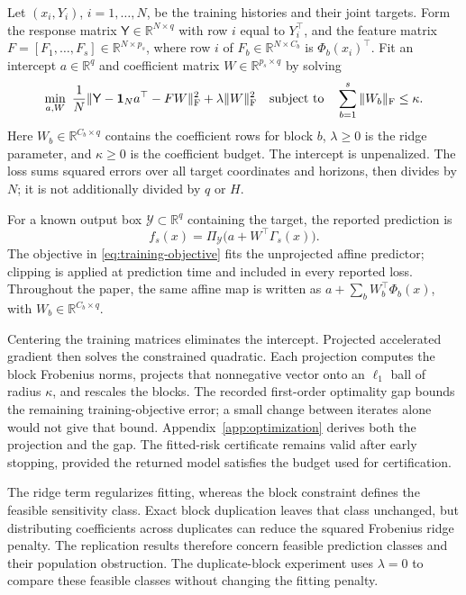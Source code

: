 Let $(x_i,Y_i)$, $i=1,\ldots,N$, be the training histories and their joint
targets. Form the response matrix $\mathsf Y\in\mathbb R^{N\times q}$
with row $i$ equal to $Y_i^\top$, and the feature matrix
$F=[F_1,\ldots,F_s]\in\mathbb R^{N\times p_s}$, where
row $i$ of $F_b\in\mathbb R^{N\times C_b}$ is
$\Phi_b(x_i)^\top$. Fit an intercept $a\in\mathbb R^q$ and coefficient
matrix $W\in\mathbb R^{p_s\times q}$ by solving
\begin{equation}
 \min_{a,W}\ \frac1N\|\mathsf Y-\mathbf1_Na^\top-FW\|_{\rm F}^2
                   +\lambda\|W\|_{\rm F}^2
 \quad\text{subject to}\quad
                \sum_{b=1}^s\|W_b\|_{\rm F}\leq\kappa.
 \label{eq:training-objective}
\end{equation}
Here $W_b\in\mathbb R^{C_b\times q}$ contains the coefficient rows for
block $b$, $\lambda\geq0$ is the ridge parameter, and $\kappa\geq0$ is
the coefficient budget. The intercept is unpenalized. The loss sums squared
errors over all target coordinates and horizons, then divides by $N$; it is
not additionally divided by $q$ or $H$.

For a known output box $\mathcal Y\subset\mathbb R^q$ containing the
target, the reported prediction is
\[
 f_s(x)=\Pi_{\mathcal Y}\bigl(a+W^\top\Gamma_s(x)\bigr).
\]
The objective in \eqref{eq:training-objective} fits the unprojected affine
predictor; clipping is applied at prediction time and included in every
reported loss. Throughout the paper, the same affine map is written as
$a+\sum_b W_b^\top\Phi_b(x)$, with $W_b\in\mathbb R^{C_b\times q}$.

Centering the training matrices eliminates the intercept. Projected accelerated
gradient then solves the constrained quadratic. Each projection computes the
block Frobenius norms, projects that nonnegative vector onto an $\ell_1$ ball
of radius $\kappa$, and rescales the blocks. The recorded first-order
optimality gap bounds the remaining training-objective error; a small change
between iterates alone would not give that bound. Appendix~\ref{app:optimization}
derives both the projection and the gap. The fitted-risk certificate remains
valid after early stopping, provided the returned model satisfies the budget
used for certification.

The ridge term regularizes fitting, whereas the block constraint defines the
feasible sensitivity class. Exact block duplication leaves that class unchanged,
but distributing coefficients across duplicates can reduce the squared
Frobenius ridge penalty. The replication results therefore concern feasible
prediction classes and their population obstruction. The duplicate-block
experiment uses $\lambda=0$ to compare these feasible classes without changing
the fitting penalty.

